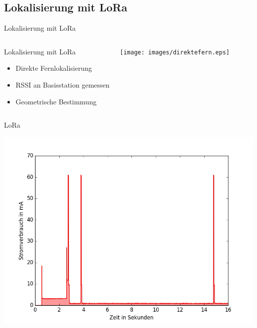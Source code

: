 \documentclass[18pt]{beamer}
\begin{document}
\subsection{Lokalisierung mit LoRa}
\begin{frame}{Lokalisierung mit LoRa}
	\begin{columns}
			\begin{block}{Lokalisierung mit LoRa}
				\begin{itemize}
					\item Direkte Fernlokalisierung
					\item RSSI an Basisstation gemessen
					\item Geometrische Bestimmung
				\end{itemize}
			\end{block}
			\centering
			\texttt{[image: images/direktefern.eps]}
	\end{columns}
\end{frame}

\begin{frame}{LoRa}
	\begin{minipage}[c][\textheight][c]{\textwidth}
		\centering
		\includegraphics[height=0.95\textheight]{plots/lora5.png}
	\end{minipage}
\end{frame}
\end{document}
